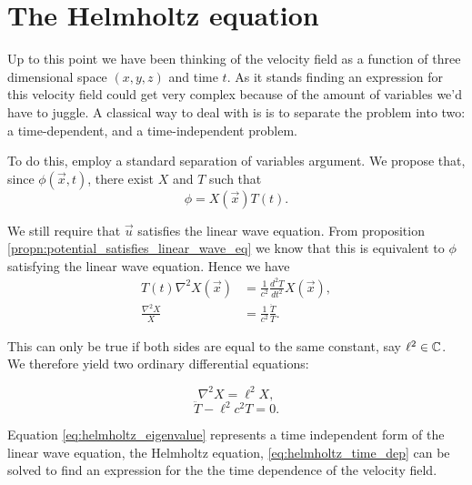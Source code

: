%
\section{The Helmholtz equation}
Up to this point we have been thinking of the velocity field as a function of three dimensional space $(x, y, z)$ and time $t$. As it stands finding an expression for this velocity field could get very complex because of the amount of variables we'd have to juggle. A classical way to deal with is is to separate the problem into two: a time-dependent, and a time-independent problem.

To do this, employ a standard separation of variables argument. We propose that, since $\phi(\vec{x}, t)$, there exist $X$ and $T$ such that
  \begin{equation}\label{eq:phi_separation}
      \phi = X(\vec{x})T(t).
  \end{equation}

We still require that $\vec{u}$ satisfies the linear wave equation. From proposition \ref{propn:potential_satisfies_linear_wave_eq} we know that this is equivalent to $\phi$ satisfying the linear wave equation. Hence we have
  \begin{align*}
      T(t) \nabla^2 X(\vec{x})
      &= \frac{1}{c^2} \frac{d^2 T}{dt^2} X(\vec{x}), \\
      \frac{\nabla^2 X}{X} &= \frac{1}{c^2} \frac{\ddot{T}}{T}.
  \end{align*}

This can only be true if both sides are equal to the same constant, say $\ell^2 \in \mathbb{C}$. We therefore yield two ordinary differential equations:
    \begin{multicols}{2}
    \noindent
        \begin{equation} \label{eq:helmholtz_eigenvalue}
            \nabla^2 X = \ell^2 X,
        \end{equation}
        \begin{equation}\label{eq:helmholtz_time_dep}
            \ddot{T} - \ell^2 c^2 T = 0.
        \end{equation}
    \end{multicols}\par
%
Equation \eqref{eq:helmholtz_eigenvalue} represents a time independent form of the linear wave equation, the Helmholtz equation, \eqref{eq:helmholtz_time_dep} can be solved to find an expression for the the time dependence of the velocity field.

